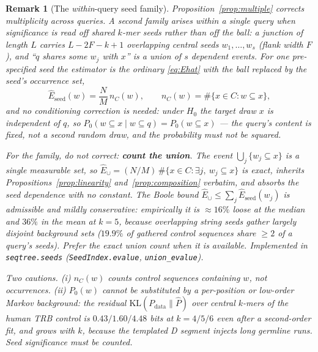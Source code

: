 \documentclass[11pt]{article}
\theoremstyle{oldplain}
\theoremstyle{oldrem}
\newtheorem{remark}{Remark}
\newcommand{\Pzero}{P_{0}}
\newcommand{\Pdata}{P_{\mathrm{data}}}
\begin{document}
\begin{remark}[The \emph{within}-query seed family]\label{rem:seedfamily}
Proposition~\ref{prop:multiple} corrects multiplicity \emph{across} queries. A second family
arises \emph{within} a single query when significance is read off shared $k$-mer seeds rather
than off the ball: a junction of length $L$ carries $L-2F-k+1$ overlapping central seeds
$w_1,\dots,w_s$ (flank width $F$), and ``$q$ shares \emph{some} $w_j$ with $x$'' is a union of
$s$ dependent events. For one \emph{pre-specified} seed the estimator is the ordinary
\eqref{eq:Ehat} with the ball replaced by the seed's occurrence set,
\begin{equation}\label{eq:eseed}
  \widehat E_{\mathrm{seed}}(w) = \frac{N}{M}\, n_C(w), \qquad n_C(w)=\#\{x\in C: w\subseteq x\},
\end{equation}
and no conditioning correction is needed: under $H_0$ the target draw $x$ is independent of $q$,
so $\Pzero(w\subseteq x \mid w\subseteq q)=\Pzero(w\subseteq x)$ --- the query's content is fixed,
not a second random draw, and the probability must \emph{not} be squared.

For the family, do not correct: \textbf{count the union}. The event
$\bigcup_j\{w_j\subseteq x\}$ is a single measurable set, so
$\widehat E_{\cup} = (N/M)\,\#\{x\in C:\exists j,\ w_j\subseteq x\}$ is exact, inherits
Propositions~\ref{prop:linearity} and~\ref{prop:composition} verbatim, and absorbs the seed
dependence with no constant. The Boole bound $\widehat E_\cup\le\sum_j \widehat E_{\mathrm{seed}}(w_j)$
is admissible and mildly conservative: empirically it is $\approx 16\%$ loose at the median and
$36\%$ in the mean at $k=5$, because overlapping string seeds gather largely disjoint background
sets ($19.9\%$ of gathered control sequences share $\ge 2$ of a query's seeds). Prefer the exact
union count when it is available. Implemented in \texttt{seqtree.seeds}
(\texttt{SeedIndex.evalue}, \texttt{union\_evalue}).

Two cautions. (i) $n_C(w)$ counts control \emph{sequences containing} $w$, not occurrences.
(ii) $\Pzero(w)$ cannot be substituted by a per-position or low-order Markov background: the
residual $\mathrm{KL}(\Pdata\|\hat P)$ over central $k$-mers of the human TRB control is
$0.43/1.60/4.48$ bits at $k=4/5/6$ even after a second-order fit, and \emph{grows} with $k$,
because the templated D segment injects long germline runs. Seed significance must be counted.
\end{remark}
\end{document}
